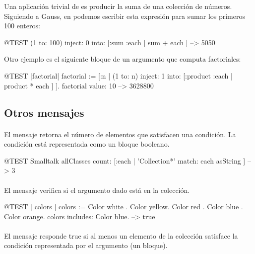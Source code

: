 \documentclass[a4paper,10pt,twoside]{book}
\begin{document}
Una aplicaci\'on trivial de  es producir la suma de una colecci\'on de n\'umeros.
Siguiendo a Gauss, en \pharo podemos escribir esta expresi\'on para sumar los primeros 100 enteros:
\begin{code}{@TEST}
(1 to: 100) inject: 0 into: [:sum :each | sum + each ] --> 5050
\end{code}

Otro ejemplo es el siguiente bloque de un argumento que computa factoriales:
\begin{code}{@TEST |factorial|}
factorial := [:n | (1 to: n) inject: 1 into: [:product :each | product * each ] ].
factorial value: 10 --> 3628800
\end{code}

\subsection{Otros mensajes}

\paragraph{} El mensaje  retorna el n\'umero de elementos que satisfacen una condici\'on. La condici\'on est\'a representada como un bloque booleano.

\begin{code}{@TEST}
Smalltalk allClasses count: [:each | 'Collection*' match: each asString ] --> 3
\end{code}

\paragraph{} El mensaje  verifica si el argumento dado est\'a en la colecci\'on. 

\begin{code}{@TEST | colors |}
colors := {Color white . Color yellow. Color red . Color blue . Color orange}.
colors includes: Color blue. --> true
\end{code}

\paragraph{} El mensaje  responde true si al menos un elemento de la colecci\'on satisface la condici\'on representada por el argumento (un bloque).
\end{document}
